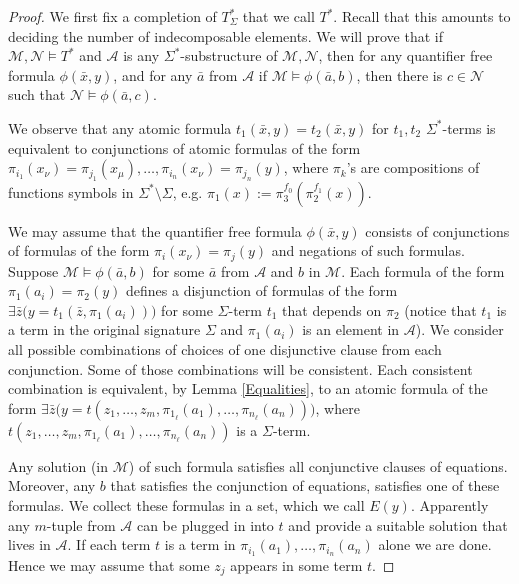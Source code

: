 \documentclass[a4paper,11pt]{article}
\begin{document}
\begin{proof}
We first fix a completion of $T_\Sigma^*$ that we call $T^*$. Recall that this amounts to deciding the number of indecomposable elements. 
We will prove that if $\mathcal{M}, \mathcal{N}\models T^*$ and $\mathcal{A}$ is any $\Sigma^*$-substructure of $\mathcal{M}, \mathcal{N}$, then for any quantifier free formula $\phi(\bar x, y)$, and for any $\bar a$ from $\mathcal{A}$ if $\mathcal{M}\models \phi(\bar a, b)$, then there is $c\in \mathcal{N}$ such that $\mathcal{N}\models \phi(\bar a, c)$. 

We observe that any atomic formula $t_1(\bar x, y)=t_2(\bar x, y)$ for $t_1, t_2$ $\Sigma^*$-terms is equivalent to conjunctions of atomic formulas of the form $\pi_{i_1}(x_\nu)=\pi_{j_1}(x_\mu), \ldots, \pi_{i_n}(x_\nu)=\pi_{j_n}(y)$, where $\pi_k$'s are compositions of functions symbols in $\Sigma^*\setminus \Sigma$, e.g. $\pi_1(x):=\pi_3^{f_0}(\pi_2^{f_1}(x))$. 

We may assume that the quantifier free formula $\phi(\bar x, y)$ consists of conjunctions of formulas of the form $\pi_{i}(x_\nu)=\pi_{j}(y)$ and negations of such formulas. Suppose $\mathcal{M}\models \phi(\bar a, b)$ for some $\bar a$ from $\mathcal{A}$ and $b$ in $\mathcal{M}$. Each formula of the form $\pi_{1}(a_i)=\pi_{2}(y)$ defines a disjunction of formulas of the form $\exists \bar z \big(y=t_1(\bar z, \pi_1(a_i))\big)$ for some $\Sigma$-term $t_1$ that depends on $\pi_2$ (notice that $t_1$ is a term in the original signature $\Sigma$ and $\pi_1(a_i)$ is an element in $\mathcal{A}$). We consider all possible combinations of choices of one disjunctive clause from each conjunction. Some of those combinations will be consistent. Each consistent combination is equivalent, by Lemma \ref{Equalities}, to an atomic formula of the form  $\exists \bar z \big(y=t(z_1, \ldots, z_m, \pi_{1_\ell}(a_1), \ldots,\pi_{n_\ell}(a_n))\big)$, where $t(z_1, \ldots, z_m, \pi_{1_\ell}(a_1), \ldots,\pi_{n_\ell}(a_n))$ is a $\Sigma$-term. 

Any solution (in $\mathcal{M}$) of such formula satisfies all conjunctive clauses of equations. Moreover, any $b$ that satisfies the conjunction of equations, satisfies one of these formulas. We collect these formulas in a set, which we call $E(y)$. Apparently any $m$-tuple from $\mathcal{A}$ can be plugged in into $t$ and provide a suitable solution that lives in $\mathcal{A}$.  If each term $t$ is a term in $\pi_{i_1}(a_1), \ldots,\pi_{i_n}(a_n)$ alone we are done. Hence we may assume that some $z_j$ appears in some term $t$. 


\end{proof}
\end{document}
